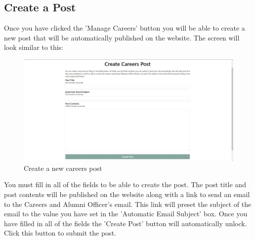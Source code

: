 \documentclass{article}
\begin{document}
\subsection{Create a Post}
Once you have clicked the 'Manage Careers' button you will be able to create a new post that will be automatically published on the website. The screen will look similar to this:
\begin{figure}[H]
    \centering
    \includegraphics[width=\textwidth,height=\textheight,keepaspectratio]{careers/careers_new_post.png}
    \caption{Create a new careers post}
    \label{fig:careers_new_post}
\end{figure}
You must fill in all of the fields to be able to create the post. The post title and post contents will be published on the website along with a link to send an email to the Careers and Alumni Officer's email. This link will preset the subject of the email to the value you have set in the 'Automatic Email Subject' box. Once you have filled in all of the fields the 'Create Post' button will automatically unlock. Click this button to submit the post.
\end{document}
